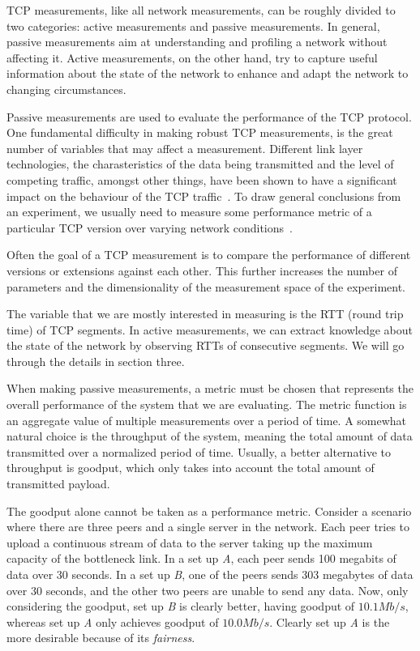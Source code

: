 TCP measurements, like all network measurements, can be roughly divided to two categories: active measurements and passive measurements. In general, passive measurements aim at understanding and profiling a network without affecting it. Active measurements, on the other hand, try to capture useful information about the state of the network to enhance and adapt the network to changing circumstances.   

Passive measurements are used to evaluate the performance of the TCP protocol. One fundamental difficulty in making robust TCP measurements, is the great number of variables that may affect a measurement. Different link layer technologies, the charasteristics of the data being transmitted and the level of competing traffic, amongst other things, have been shown to have a significant impact on the behaviour of the TCP traffic~\cite{Allman99}. To draw general conclusions from an experiment, we usually need to measure some performance metric of a particular TCP version over varying network conditions~\cite{Allman99}.  

Often the goal of a TCP measurement is to compare the performance of different versions or extensions against each other. This further increases the number of parameters and the dimensionality of the measurement space of the experiment.

The variable that we are mostly interested in measuring is the RTT (round trip time) of TCP segments. In active measurements, we can extract knowledge about the state of the network by observing RTTs of consecutive segments. We will go through the details in section three. 

When making passive measurements, a metric must be chosen that represents the overall performance of the system that we are evaluating. The metric function is an aggregate value of multiple measurements over a period of time. A somewhat natural choice is the throughput of the system, meaning the total amount of data transmitted over a normalized period of time. Usually, a better alternative to throughput is goodput, which only takes into account the total amount of transmitted payload. 

The goodput alone cannot be taken as a performance metric. Consider a scenario where there are three peers and a single server in the network. Each peer tries to upload a continuous stream of data to the server taking up the maximum capacity of the bottleneck link. In a set up \textit{A}, each peer sends 100 megabits of data over 30 seconds. In a set up \textit{B}, one of the peers sends 303 megabytes of data over 30 seconds, and the other two peers are unable to send any data. Now, only considering the goodput, set up \textit{B} is clearly better, having goodput of $10.1Mb/s$, whereas set up \textit{A} only achieves goodput of $10.0Mb/s$. Clearly set up \textit{A} is the more desirable because of its \textit{fairness}.

